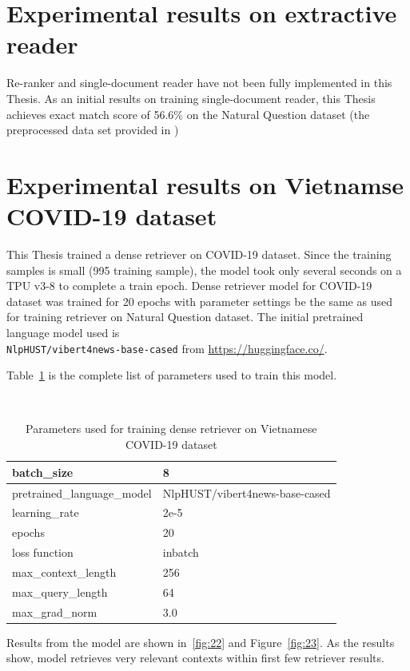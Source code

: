 \documentclass[12pt, sort&compress]{report}
\begin{document}
\section{Experimental results on extractive reader}
\label{sec:4.5}
Re-ranker and single-document reader have not been fully implemented in this Thesis. As an initial results on training single-document reader, this Thesis achieves exact match score of 56.6\% on the Natural Question dataset (the preprocessed data set provided in \cite{karpukhin2020dense})
\section{Experimental results on Vietnamse COVID-19 dataset}
\label{sec:4.6}
This Thesis trained a dense retriever on COVID-19 dataset. Since the training samples is small (995 training sample), the model took only several seconds on a TPU v3-8 to complete a train epoch. Dense retriever model for COVID-19 dataset was trained for 20 epochs with parameter settings be the same as used for training retriever on Natural Question dataset. The initial pretrained language model used is \\{\tt NlpHUST/vibert4news-base-cased} from \url{https://huggingface.co/}. 
\par Table~\ref{tab:05} is the complete list of parameters used to train this model.
\begin{table}
	\caption{Parameters used for training dense retriever on Vietnamese COVID-19 dataset}
	\label{tab:05}
	\centering
	{\tt
		\begin{tabular}{p{.4\linewidth}p{.5\linewidth}}
			\hline
			batch\_size & 8 \\\hline
			pretrained\_language\_model & NlpHUST/vibert4news-base-cased \\\hline
			learning\_rate & 2e-5 \\\hline
			epochs & 20 \\\hline
			loss function & inbatch \\\hline
			max\_context\_length & 256 \\\hline
			max\_query\_length & 64 \\\hline
			max\_grad\_norm & 3.0 \\\hline
	\end{tabular}}
\end{table}
\par Results from the model are shown in~\ref{fig:22} and Figure~\ref{fig:23}. As the results show, model retrieves very relevant contexts within first few retriever results.
\end{document}
